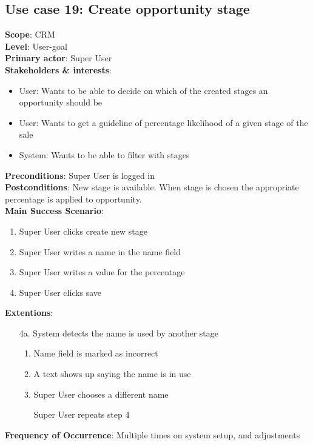 \subsection{Use case 19: Create opportunity stage}
\textbf{Scope}: CRM \\
\textbf{Level}: User-goal \\
\textbf{Primary actor}: Super User \\
\textbf{Stakeholders \& interests}:
\begin{itemize}
  \item User: Wants to be able to decide on which of the created stages an opportunity should be
  \item User: Wants to get a guideline of percentage likelihood of a given stage of the sale
  \item System: Wants to be able to filter with stages
\end{itemize}
\textbf{Preconditions}: Super User is logged in \\
\textbf{Postconditions}: New stage is available. When stage is chosen the appropriate percentage is applied to opportunity.\\
\textbf{Main Success Scenario}:
\begin{enumerate}
  \item Super User clicks create new stage
  \item Super User writes a name in the name field
  \item Super User writes a value for the percentage
  \item Super User clicks save
\end{enumerate}
\textbf{Extentions}:
\begin{itemize}
  \item [4a.] System detects the name is used by another stage
  \begin{enumerate}
    \item Name field is marked as incorrect
    \item A text shows up saying the name is in use
    \item Super User chooses a different name
    \item [] Super User repeats step 4
  \end{enumerate}
\end{itemize}
\textbf{Frequency of Occurrence}: Multiple times on system setup, and adjustments

